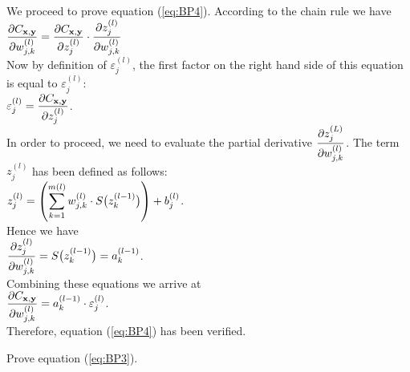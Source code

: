 We proceed to prove equation (\ref{eq:BP4}).  
According to the chain rule we have
\\[0.2cm]
\hspace*{1.3cm}
$ \displaystyle\frac{\partial C_{\mathbf{x}, \mathbf{y}}}{\partial w_{j,k}^{(l)}}  =  
  \frac{\partial C_{\mathbf{x}, \mathbf{y}}}{\partial z_j^{(l)}} \cdot \frac{\partial z_j^{(l)}}{\partial w_{j,k}^{(l)}} 
$ 
\\[0.2cm]
Now by definition of $\varepsilon_j^{(l)}$, the first factor on the right hand side of this equation is equal to $\varepsilon_j^{(l)}$: 
\\[0.2cm]
\hspace*{1.3cm}
$\displaystyle \varepsilon_j^{(l)} = \frac{\partial C_{\mathbf{x}, \mathbf{y}}}{\partial z_j^{(l)}}$.
\\[0.0cm]
In order to proceed, we need to evaluate the partial derivative
$\displaystyle\frac{\partial z_j^{(L)}}{\partial w_{j,k}^{(l)}}$.  The term $z_j^{(l)}$ has been defined as follows:
\\[0.2cm]
\hspace*{1.3cm}
$\displaystyle z_j^{(l)} = \left(\sum\limits_{k=1}^{m(l)} w_{j,k}^{(l)} \cdot S\bigl(z_k^{(l-1)}\bigr)\right) + b_j^{(l)}$.
\\[0.2cm]
Hence we have
\\[0.2cm]
\hspace*{1.3cm}
$\displaystyle\frac{\partial z_j^{(l)}}{\partial w_{j,k}^{(l)}} = S\bigl(z_k^{(l-1)}\bigr) = a_k^{(l-1)}$. 
\\[0.2cm]
Combining these equations we arrive at
\\[0.2cm]
\hspace*{1.3cm}
$ \displaystyle\frac{\partial C_{\mathbf{x}, \mathbf{y}}}{\partial w_{j,k}^{(l)}}  =  
  a_k^{(l-1)} \cdot \varepsilon_j^{(l)} 
$. 
\\[0.2cm]
Therefore, equation (\ref{eq:BP4}) has been verified.

\exercise
Prove equation (\ref{eq:BP3}).
\eoxs

